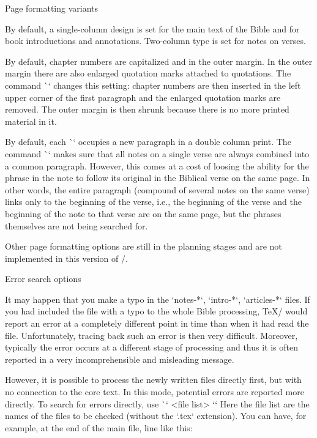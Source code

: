 {{\filbreak

\sec Page formatting variants

By default, a single-column design is set for the main text of the Bible
and for book introductions and annotations. Two-column type is set for
notes on verses.

By default, chapter numbers are capitalized and in the outer margin. 
In the outer margin there are also enlarged quotation marks attached to quotations. 
The command \`\normalchapnumbers` changes this setting: chapter numbers are then inserted in the left
upper corner of the first paragraph and the enlarged quotation marks are removed.
The outer margin is then shrunk because there is no more printed material in it.  



By default, each \`\Note` occupies a new paragraph in a  double column print. 
The command \`\mergednotes` makes sure that all notes on a single verse are always 
combined into a common paragraph. 
However, this comes at a cost of loosing the ability for the phrase in the note
to follow its original in the Biblical verse on the same page.
In other words, the entire paragraph (compound of several notes on the same verse)
links only  to the beginning of the verse, i.e., the beginning of the verse 
and the beginning of the note to that verse are on the same page,
but the phrases themselves are not being searched for.

Other page formatting options are still in the planning stages and are not implemented in this version of \OpBible/.


\sec Error search options

It may happen that you make a typo in the `notes-*`, `intro-*`,
`articles-*` files. If you had included the file with a typo to the whole Bible processing,
\TeX/ would report an error at a completely different point in time than when it had read the file. 
Unfortunately, tracing back such an error is then very difficult. Moreover, typically the error
occurs at a different stage of processing and thus it is often reported in a very
incomprehensible and misleading message.

However, it is possible to process the newly written files directly first, 
but with no connection to the core text. 
In this mode, potential errors are reported more directly.
To search for errors directly, use \`\checksyntax` <file list> `{}`
Here the file list are the names of the files to be checked (without the `.tex` extension).
You can have, for example, at the end of the main file, line like this:

}}
